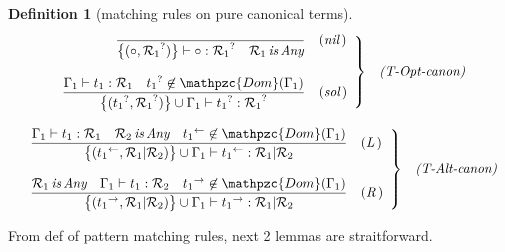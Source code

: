 \documentclass[12pt]{article}
\newtheorem{Definition}{Definition}[section]
\begin{document}
\begin{Definition}[matching rules on pure canonical terms]
\begin{displaymath}
\begin{array}{c}
      \begin{array}{rl}
        \left. \begin{array}{rl}
          \dfrac{
          }{
            \bigl\{(\circ, {\mathcal{R}_1}^? ) \bigr\} \vdash
             \circ : {\mathcal{R}_1}^?
              \quad \mathcal{R}_1 \,\text{\it is}\, \text{\it Any}
          }  &  (\text{\it nil}\,)  \\
          \\
          \dfrac{
            \Gamma_1 \vdash t_1 : \mathcal{R}_1
            \quad {t_1}^? \not\in \mathpzc{Dom}(\Gamma_1)
          }{
            \bigl\{({t_1}^?, {\mathcal{R}_1}^?) \bigr\} \cup \Gamma_1 \vdash
                   {t_1}^? : {\mathcal{R}_1}^?
          }  &  (\text{\it sol}\,)
        \end{array} \right\}  &  \text{\it (T-Opt-canon)}
      \end{array}  \\
      
      \\
      \begin{array}{rl}
        \left. \begin{array}{rl}
          \dfrac{
            \Gamma_1 \vdash t_1 : \mathcal{R}_1
            \quad \mathcal{R}_2 \,\text{\it is}\, \text{\it Any}
            \quad {t_1}^{\leftarrow} \not\in \mathpzc{Dom}(\Gamma_1)
          }{
            \bigl\{({t_1}^\leftarrow, \mathcal{R}_1 | \mathcal{R}_2)
             \bigr\} \cup \Gamma_1 \vdash {t_1}^\leftarrow :
              \mathcal{R}_1 | \mathcal{R}_2
          }  &  (\text{\it L}\,)  \\
          \\
          \dfrac{
            \mathcal{R}_1 \,\text{\it is}\, \text{\it Any}
            \quad \Gamma_1 \vdash t_1 : \mathcal{R}_2
            \quad {t_1}^{\rightarrow} \not\in \mathpzc{Dom}(\Gamma_1)
          }{
            \bigl\{({t_1}^{\rightarrow}, \mathcal{R}_1 | \mathcal{R}_2)
             \bigr\} \cup \Gamma_1 \vdash {t_1}^\rightarrow :
              \mathcal{R}_1 | \mathcal{R}_2
          }  &  (\text{\it R}\,)
        \end{array} \right\}  &  \text{\it (T-Alt-canon)}
      \end{array}  
    \end{array}
  \end{displaymath}  
\end{Definition}


From def of pattern matching rules, next 2 lemmas are straitforward.
\end{document}
